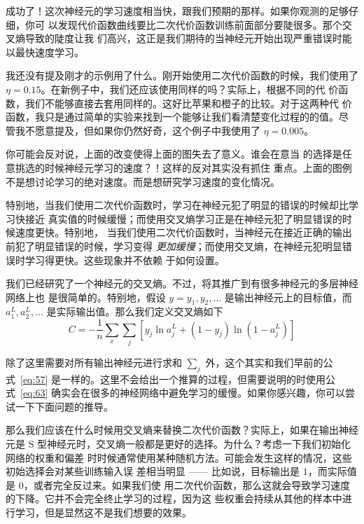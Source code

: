 成功了！这次神经元的学习速度相当快，跟我们预期的那样。如果你观测的足够仔细，你可
以发现代价函数曲线要比二次代价函数训练前面部分要陡很多。那个交叉熵导致的陡度让我
们高兴，这正是我们期待的当神经元开始出现严重错误时能以最快速度学习。

我还没有提及刚才的示例用了什么\learningrate{}。刚开始使用二次代价函数的时候，我们使用了
$\eta = 0.15$。在新例子中，我们还应该使用同样的\learningrate{}吗？实际上，根据不同的代
价函数，我们不能够直接去套用同样的\learningrate{}。这好比苹果和橙子的比较。对于这两种代
价函数，我只是通过简单的实验来找到一个能够让我们看清楚变化过程的\learningrate{}的值。尽
管我不愿意提及，但如果你仍然好奇，这个例子中我使用了 $\eta = 0.005$。

你可能会反对说，上面\learningrate{}的改变使得上面的图失去了意义。谁会在意当%
\learningrate{}的选择是任意挑选的时候神经元学习的速度？！这样的反对其实没有抓住
重点。上面的图例不是想讨论学习的绝对速度。而是想研究学习速度的变化情况。

特别地，当我们使用二次代价函数时，学习在神经元犯了明显的错误的时候却比学习快接近
真实值的时候缓慢；而使用交叉熵学习正是在神经元犯了明显错误的时候速度更快。特别地，
当我们使用二次代价函数时，当神经元在接近正确的输出前犯了明显错误的时候，学习变得
\emph{更加缓慢}；而使用交叉熵，在神经元犯明显错误时学习得更快。这些现象并不依赖
于如何设置\learningrate{}。

我们已经研究了一个神经元的交叉熵。不过，将其推广到有很多神经元的多层神经网络上也
是很简单的。特别地，假设 $y = y_1, y_2, \ldots$ 是输出神经元上的目标值，而
$a^L_1, a^L_2, \ldots$ 是实际输出值。那么我们定义交叉熵如下
\begin{equation}
  C = -\frac{1}{n} \sum_x \sum_j \left[y_j \ln a^L_j + (1-y_j) \ln (1-a^L_j) \right]
  \label{eq:63}\tag{63}
\end{equation}

除了这里需要对所有输出神经元进行求和 $\sum_j$ 外，这个其实和我们早前的公
式~\eqref{eq:57} 是一样的。这里不会给出一个推算的过程，但需要说明的时使用公
式~\eqref{eq:63} 确实会在很多的神经网络中避免学习的缓慢。如果你感兴趣，你可以尝
试一下下面问题的推导。

那么我们应该在什么时候用交叉熵来替换二次代价函数？实际上，如果在输出神经元是 S
型神经元时，交叉熵一般都是更好的选择。为什么？考虑一下我们初始化网络的权重和偏差
时时候通常使用某种随机方法。可能会发生这样的情况，这些初始选择会对某些训练输入误
差相当明显 —— 比如说，目标输出是 $1$，而实际值是 $0$，或者完全反过来。如果我们使
用二次代价函数，那么这就会导致学习速度的下降。它并不会完全终止学习的过程，因为这
些权重会持续从其他的样本中进行学习，但是显然这不是我们想要的效果。


